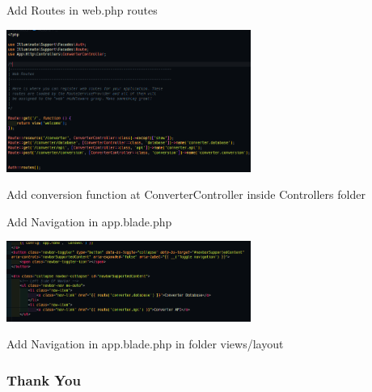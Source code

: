 \documentclass[aspectratio=169, table]{beamer}
\begin{document}
\begin{frame}{Add Routes in web.php routes}
    \vskip1cm
    \begin{center}
        \includegraphics[width=0.6\textwidth]{classFiles/pertemuan-13-converter-routes.png}


        Add conversion function at ConverterController inside Controllers folder
    \end{center}
    \vfill %
\end{frame}

\begin{frame}{Add Navigation in app.blade.php}
    \vskip1cm
    \begin{center}
        \includegraphics[width=0.6\textwidth]{classFiles/pertemuan-13-app-navigation.png}


        Add Navigation in app.blade.php in folder views/layout
    \end{center}
    \vfill %
\end{frame}

\begin{frame4}
    \frametitle{Thank You}
\end{frame4}
\end{document}
